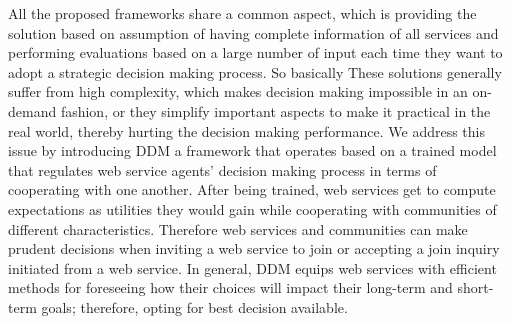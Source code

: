 \documentclass[11pt,onecolumn]{IEEEtran}
\begin{document}
{All the proposed frameworks share a common aspect, which is providing the solution based on assumption of having complete information of all services and performing evaluations based on a large number of input each time they want to adopt a strategic decision making process. 
So basically These solutions generally suffer from high complexity, which makes decision making impossible in an on-demand fashion, or they simplify important aspects to make it practical in the real world, thereby hurting the decision making performance. We address this issue by introducing DDM a framework that operates based on a trained model that regulates web service agents' decision making process in terms of cooperating with one another. After being trained, web services get to compute expectations as utilities they would gain while cooperating with communities of different characteristics. Therefore web services and communities can make prudent decisions when inviting a web service to join or accepting a join inquiry initiated from a web service. In general, DDM equips web services with efficient methods for foreseeing how their choices will impact their long-term and short-term goals; therefore, opting for best decision available. 






}
\end{document}
